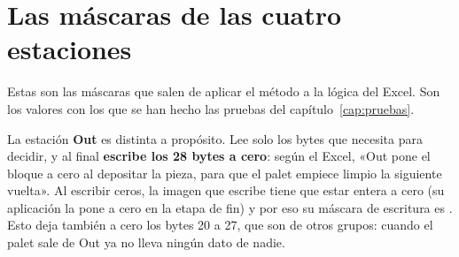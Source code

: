 \section{Las máscaras de las cuatro estaciones}
Estas son las máscaras que salen de aplicar el método a la lógica del Excel. Son los valores con los que se han hecho las pruebas del capítulo~\ref{cap:pruebas}.



\begin{ojo}
La estación \textbf{Out} es distinta a propósito. Lee solo los bytes que necesita para decidir, y al final \textbf{escribe los 28 bytes a cero}: según el Excel, «Out pone el bloque a cero al depositar la pieza, para que el palet empiece limpio la siguiente vuelta». Al escribir ceros, la imagen que escribe tiene que estar entera a cero (su aplicación la pone a cero en la etapa de fin) y por eso su máscara de escritura es . Esto deja también a cero los bytes 20 a 27, que son de otros grupos: cuando el palet sale de Out ya no lleva ningún dato de nadie.
\end{ojo}

